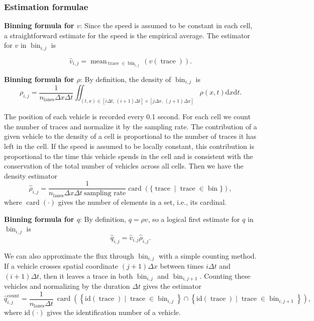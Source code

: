 \documentclass[a4paper, 10pt, conference]{ieeeconf}      %
\DeclareMathOperator{\card}{card}
\DeclareMathOperator{\trc}{trace}
\DeclareMathOperator{\mean}{mean}
\DeclareMathOperator{\bin}{bin}
\DeclareMathOperator{\lns}{lanes}
\DeclareMathOperator{\cnt}{count}
\begin{document}
\subsubsection{Estimation formulae}
\textbf{Binning formula for $v$}: Since the speed is assumed to be constant in each cell, a straightforward estimate for the speed is the empirical average. The estimator for $v$ in $\bin_{i,j}$ is

\begin{equation}
\widehat{v}_{i,j}=\mean_{\trc \in \bin_{i,j}}(v(\trc)).
\end{equation}

\textbf{Binning formula for $\rho$}: By definition, the density of $\bin_{i,j}$ is  
\begin{equation}
\rho_{i,j}=\frac{1}{n_{\lns}\Delta x\Delta t}\iint_{\left(t,x\right)\in [i\Delta t, \,(i+1)\Delta t] \times [j\Delta x,\,(j+1)\Delta x]}\rho(x,t) \text{d}x \text{d}t.
\end{equation}

The position of each vehicle is recorded every 0.1 second. For each cell we count the number of traces and normalize it by the sampling rate. The contribution of a given vehicle to the density of a cell is proportional to the number of traces it has left in the cell. If the speed is assumed to be locally constant, this contribution is proportional to the time this vehicle spends in the cell and is consistent with the conservation of the total number of vehicles across all cells. Then we have the density estimator
\begin{equation}
\widehat{\rho}_{i,j}=\frac{1}{n_{\lns} \Delta x \Delta t \: \text{sampling rate}}\card ( \{ \trc \mid \trc \in \bin \} ),
\end{equation}
where $\card (\cdot)$ gives the number of elements in a set, i.e., its cardinal. 

\textbf{Binning formula for $q$}: By definition, $q=\rho v$, so a logical first estimate for $q$ in $\bin_{i,j}$ is 
\begin{equation}
\widehat{q}_{i,j}=\widehat{v}_{i,j}\widehat{\rho}_{i,j}.
\end{equation}

We can also approximate the flux through $\bin_{i,j}$ with a simple counting method. If a vehicle crosses spatial coordinate $\left(j+1\right)\Delta x$ between times $i\Delta t$ and $\left(i+1\right)\Delta t$, then it leaves a trace in both $\bin_{i,j}$ and $\bin_{i,j+1}$. Counting these vehicles and normalizing by the duration $\Delta t$ gives the estimator
\begin{equation}
\widehat{q}_{i,j}^{\cnt}=\frac{1}{n_{\lns}\Delta t}\: \card\left(\left\{ \text{id} \left(\trc\right)\mid \trc \in \bin_{i,j}\right\} \cap\left\{ \text{id}\left( \trc \right)\mid \trc\in \bin_{i,j+1}\right\} \right),
\end{equation}
where id$(\cdot)$ gives the identification number of a vehicle.
\end{document}
